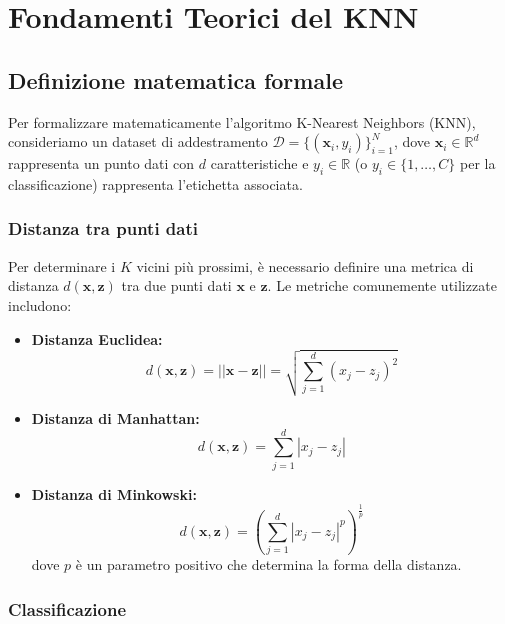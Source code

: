 \section{Fondamenti Teorici del KNN}

\subsection{Definizione matematica formale}

Per formalizzare matematicamente l'algoritmo K-Nearest Neighbors (KNN), consideriamo un dataset di addestramento \( \mathcal{D} = \{(\mathbf{x}_i, y_i)\}_{i=1}^N \), dove \( \mathbf{x}_i \in \mathbb{R}^d \) rappresenta un punto dati con \( d \) caratteristiche e \( y_i \in \mathbb{R} \) (o \( y_i \in \{1, \ldots, C\} \) per la classificazione) rappresenta l'etichetta associata.

\subsubsection{Distanza tra punti dati}

Per determinare i \( K \) vicini più prossimi, è necessario definire una metrica di distanza \( d(\mathbf{x}, \mathbf{z}) \) tra due punti dati \( \mathbf{x} \) e \( \mathbf{z} \). Le metriche comunemente utilizzate includono:

\begin{itemize}
    \item \textbf{Distanza Euclidea:}
    \[
    d(\mathbf{x}, \mathbf{z}) = ||\mathbf{x} - \mathbf{z}|| = \sqrt{\sum_{j=1}^d (x_j - z_j)^2}
    \]

    \item \textbf{Distanza di Manhattan:}
    \[
    d(\mathbf{x}, \mathbf{z}) = \sum_{j=1}^d |x_j - z_j|
    \]

    \item \textbf{Distanza di Minkowski:}
    \[
    d(\mathbf{x}, \mathbf{z}) = \left( \sum_{j=1}^d |x_j - z_j|^p \right)^{\frac{1}{p}}
    \]
    dove \( p \) è un parametro positivo che determina la forma della distanza.
\end{itemize}

\subsubsection{Classificazione}

